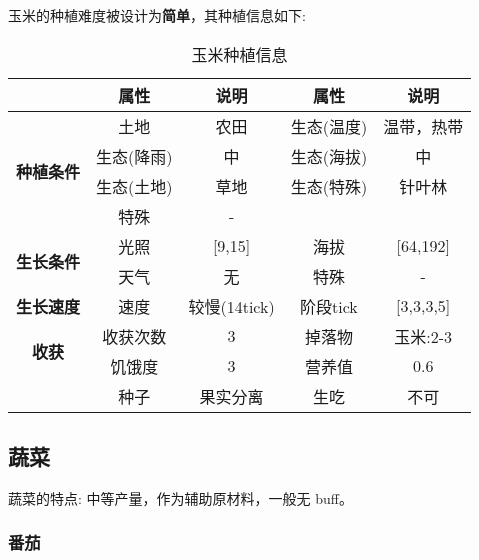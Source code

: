 玉米的种植难度被设计为\textbf{简单}，其种植信息如下:

\begin{table}[H]
    \centering
    \caption{玉米种植信息}
    \label{table:玉米种植信息}
    \setlength{\tabcolsep}{4mm}
    \begin{tabular}{c|cc|cc}
        \toprule
                                           & \textbf{属性} & \textbf{说明} & \textbf{属性} & \textbf{说明} \\
        \midrule
        \multirow{4}{*}{\textbf{种植条件}} & 土地          & 农田          & 生态(温度)    & 温带，热带    \\
                                           & 生态(降雨)    & 中            & 生态(海拔)    & 中            \\
                                           & 生态(土地)    & 草地          & 生态(特殊)    & 针叶林        \\
                                           & 特殊          & -                                             \\
        \midrule
        \multirow{2}{*}{\textbf{生长条件}} & 光照          & [9,15]        & 海拔          & [64,192]      \\
                                           & 天气          & 无            & 特殊          & -             \\
        \midrule
        \textbf{生长速度}                  & 速度          & 较慢(14tick)  & 阶段tick      & [3,3,3,5]     \\
        \midrule
        \multirow{2}{*}{\textbf{收获}}     & 收获次数      & 3             & 掉落物        & 玉米:2-3      \\
                                           & 饥饿度        & 3             & 营养值        & 0.6           \\
                                           & 种子          & 果实分离      & 生吃          & 不可          \\
        \bottomrule
    \end{tabular}
\end{table}

\subsection{蔬菜}

蔬菜的特点: 中等产量，作为辅助原材料，一般无 buff。

\subsubsection{番茄}


